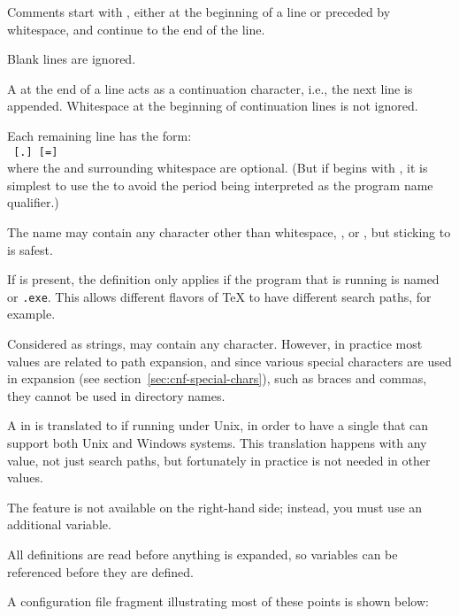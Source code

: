 \documentclass{article}
\begin{document}
\begin{itemize*}
\item
  Comments start with \code{\%}, either at the beginning of a line or
  preceded by whitespace, and continue to the end of the line.
\item
  Blank lines are ignored.
\item
  A \bs{} at the end of a line acts as a continuation character,
  i.e., the next line is appended.  Whitespace at the beginning of
  continuation lines is not ignored.
\item
  Each remaining line has the form:\\
  \hspace*{2em}\texttt{ \textrm{[}.\textrm{]}
  \textrm{[}=\textrm{]} }\\[1pt]
  where the \samp{=} and surrounding whitespace are optional.
  (But if  begins with , it is simplest to use the
  \samp{=} to avoid the period being interpreted as the program name
  qualifier.)
\item
  The  name may contain any character other
  than whitespace, \samp{=}, or , but sticking to
   is safest.
\item
  If  is present, the definition only
  applies if the program that is running is named
  \texttt{} or \texttt{.exe}.  This allows
  different flavors of \TeX{} to have different search paths, for
  example.
\item Considered as strings,  may contain any character.
  However, in practice most  values are related to path
  expansion, and since various special characters are used in expansion
  (see section~\ref{sec:cnf-special-chars}), such as braces and commas,
  they cannot be used in directory names.
  
  A \samp{;} in  is translated to \samp{:} if running under
  Unix, in order to have a single  that can support both
  Unix and Windows systems. This translation happens with any value, not
  just search paths, but fortunately in practice \samp{;} is not needed
  in other values.
  
  The  feature is not available on the
  right-hand side; instead, you must use an additional variable.
  
\item
  All definitions are read before anything is expanded, so
  variables can be referenced before they are defined.
\end{itemize*}
A configuration file fragment illustrating most of these points is
\ifSingleColumn
shown below:
\end{document}
